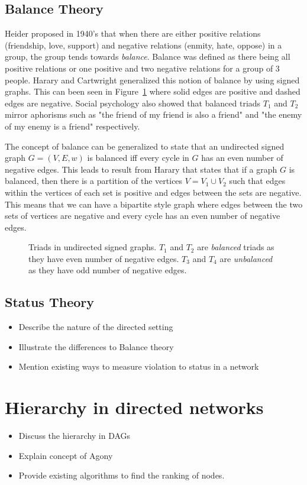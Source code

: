 \subsection{Balance Theory}
\label{sec:balance-theory}


Heider \cite{heider1946attitudes} proposed in 1940's that when there are either positive relations (friendship, love, support) and negative relations (enmity, hate, oppose) in a group, the  group tends towards \textit{balance}. Balance was defined as there being all positive relations or one positive and two negative relations for a group of 3 people. Harary and Cartwright \cite{cartwright1956structural} generalized this notion of balance by using signed graphs. This can been seen in Figure~\ref{fig:balance-triads} where solid edges are positive and dashed edges are negative. Social psychology also showed that balanced triads $T_1$ and $T_2$ mirror aphorisms such as "the friend of my friend is also a friend" and "the enemy of my enemy is a friend" respectively. 

The concept of balance can be generalized to state that an undirected signed graph $G=(V,E,w)$ is balanced iff every cycle in $G$ has an even number of negative edges. This leads to result from Harary \cite{harary1953on} that states that if a graph $G$ is balanced, then there is a partition of the vertices $V = V_1 \cup V_2$ such that edges within the vertices of each set is positive and edges between the sets are negative. This means that we can have a bipartite style graph where edges between the two sets of vertices are negative and every cycle has an even number of negative edges.   

\begin{figure}[!ht]     
    \centering
      
    \caption{Triads in undirected signed graphs. $T_1$ and $T_2$ are \textit{balanced} triads as they have even number of negative edges. $T_3$ and $T_4$ are \textit{unbalanced} as they have odd number of negative edges.}
    \label{fig:balance-triads}
\end{figure}

\subsection{Status Theory}
\label{sec:status-theory}
\begin{itemize}
    \item Describe the nature of the directed setting
    \item Illustrate the differences to Balance theory
    \item Mention existing ways to measure violation to status in a network
\end{itemize}

\section{Hierarchy in directed networks}
\label{sec:hierarchy}
\begin{itemize}
    \item Discuss the hierarchy in DAGs
    \item Explain concept of Agony
    \item Provide existing algorithms to find the ranking of nodes.
\end{itemize}